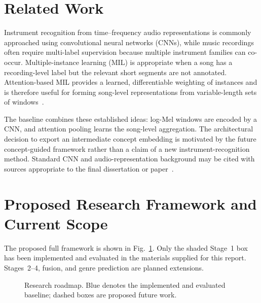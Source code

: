\documentclass[conference]{IEEEtran}
\begin{document}
\section{Related Work}
Instrument recognition from time--frequency audio representations is commonly approached using convolutional neural networks (CNNs), while music recordings often require multi-label supervision because multiple instrument families can co-occur. Multiple-instance learning (MIL) is appropriate when a song has a recording-level label but the relevant short segments are not annotated. Attention-based MIL provides a learned, differentiable weighting of instances and is therefore useful for forming song-level representations from variable-length sets of windows~\cite{ilse2018attention}.

The baseline combines these established ideas: log-Mel windows are encoded by a CNN, and attention pooling learns the song-level aggregation. The architectural decision to export an intermediate concept embedding is motivated by the future concept-guided framework rather than a claim of a new instrument-recognition method. Standard CNN and audio-representation background may be cited with sources appropriate to the final dissertation or paper~\cite{hershey2017cnn,choi2017transfer}.

\section{Proposed Research Framework and Current Scope}
The proposed full framework is shown in Fig.~\ref{fig:roadmap}. Only the shaded Stage~1 box has been implemented and evaluated in the materials supplied for this report. Stages~2--4, fusion, and genre prediction are planned extensions.

\begin{figure}[t]
\centering
{}
\caption{Research roadmap. Blue denotes the implemented and evaluated baseline; dashed boxes are proposed future work.}
\label{fig:roadmap}
\end{figure}
\end{document}
